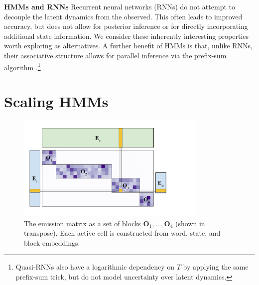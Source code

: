 \documentclass[11pt,a4paper]{article}
\begin{document}

\noindent \textbf{HMMs and RNNs}
Recurrent neural networks (RNNs) do not attempt to decouple the latent dynamics from the observed.
This often leads to improved accuracy,
but does not allow for posterior inference or for directly incorporating additional
state information. We consider these inherently interesting properties worth exploring as alternatives.
A further benefit of HMMs is that, unlike RNNs,
their associative structure allows for parallel inference
via the prefix-sum algorithm \cite{ladner1980prefix}.\footnote{Quasi-RNNs \citep{bradbury2016qrnn} also have a logarithmic dependency on $T$
by applying the same prefix-sum trick, but do not model uncertainty over
latent dynamics.}


\section{Scaling HMMs}

\begin{figure}[t]
\centering
\includegraphics[height=2in]{img/mat.pdf}
\caption{\label{fig:emit}
The emission matrix as a set of blocks $\mathbf{O}_1, \ldots, \mathbf{O}_4$ (shown in transpose). Each active cell is constructed from word, state, and block embeddings. 
}
\end{figure}
\end{document}
